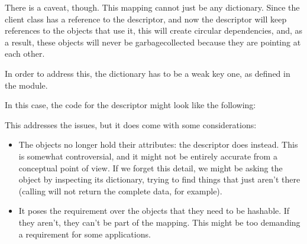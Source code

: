 \documentclass[a4paper,10pt,english]{sphinxmanual}
\begin{document}
There is a caveat, though. This mapping cannot just be any dictionary. Since the client
class has a reference to the descriptor, and now the descriptor will keep references to the
objects that use it, this will create circular dependencies, and, as a result, these objects will
never be garbage\sphinxhyphen{}collected because they are pointing at each other.

In order to address this, the dictionary has to be a weak key one, as defined in the
 module.

In this case, the code for the descriptor might look like the following:

\begin{sphinxVerbatim}[commandchars=\\\{\}]
   

 
      
          
          

       
           
             
          

       
        \PYG{p}{[}\PYG{p}{]}  
\end{sphinxVerbatim}

This addresses the issues, but it does come with some considerations:
\begin{itemize}
\item {} 
The objects no longer hold their attributes: the descriptor does instead. This is somewhat controversial, and it might not be entirely accurate from a conceptual point of view. If we forget this detail, we might be asking the object by inspecting its dictionary, trying to find things that just aren’t there (calling  will not return the complete data, for example).

\item {} 
It poses the requirement over the objects that they need to be hashable. If they aren’t, they can’t be part of the mapping. This might be too demanding a requirement for some applications.

\end{itemize}
\end{document}

